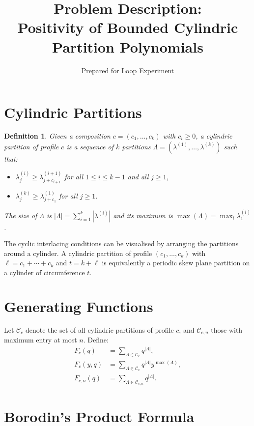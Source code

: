 \documentclass[11pt]{article}
\title{Problem Description:\\Positivity of Bounded Cylindric Partition Polynomials}
\author{Prepared for Loop Experiment}
\date{}
\newtheorem{definition}{Definition}
\begin{document}
\maketitle

\section{Cylindric Partitions}

\begin{definition}
Given a composition $c=(c_1,\ldots,c_k)$ with $c_i \geq 0$, a \emph{cylindric partition of profile $c$} is a sequence of $k$ partitions
$\Lambda=(\lambda^{(1)},\ldots,\lambda^{(k)})$ such that:
\begin{itemize}
\item $\lambda^{(i)}_j \geq \lambda^{(i+1)}_{j+c_{i+1}}$ for all $1 \leq i \leq k-1$ and all $j \geq 1$,
\item $\lambda^{(k)}_j \geq \lambda^{(1)}_{j+c_1}$ for all $j \geq 1$.
\end{itemize}
The \emph{size} of $\Lambda$ is $|\Lambda| = \sum_{i=1}^k |\lambda^{(i)}|$ and its \emph{maximum} is $\max(\Lambda) = \max_i \lambda^{(i)}_1$.
\end{definition}

The cyclic interlacing conditions can be visualised by arranging the partitions around a cylinder. A cylindric partition of profile $(c_1,\ldots,c_k)$ with $\ell = c_1+\cdots+c_k$ and $t=k+\ell$ is equivalently a periodic skew plane partition on a cylinder of circumference $t$.

\section{Generating Functions}

Let $\mathcal{C}_c$ denote the set of all cylindric partitions of profile $c$, and $\mathcal{C}_{c,n}$ those with maximum entry at most $n$. Define:
\begin{align}
F_c(q) &= \sum_{\Lambda \in \mathcal{C}_c} q^{|\Lambda|}, \\
F_c(y,q) &= \sum_{\Lambda \in \mathcal{C}_c} q^{|\Lambda|} y^{\max(\Lambda)}, \\
F_{c,n}(q) &= \sum_{\Lambda \in \mathcal{C}_{c,n}} q^{|\Lambda|}.
\end{align}

\section{Borodin's Product Formula}
\end{document}
